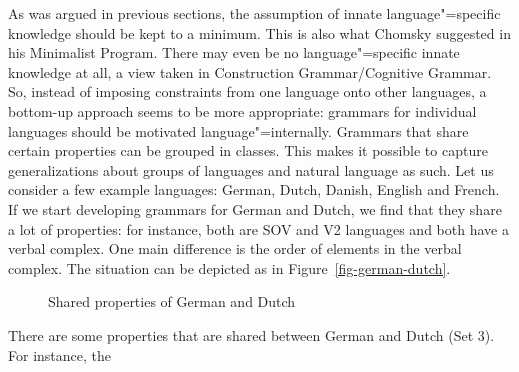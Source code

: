 As was argued in previous sections, the assumption of innate language"=specific knowledge should be
kept to a minimum. This is also what Chomsky suggested in his Minimalist Program. There may even be no language"=specific innate knowledge at all, a view taken in Construction
Grammar/Cognitive Grammar. So, instead of imposing constraints from one language onto other languages, a bottom-up approach seems
to be more appropriate: grammars for individual languages should be motivated language"=internally. Grammars that share certain properties can be grouped in classes. This makes it possible
to capture generalizations about groups of languages and natural language as such. Let us consider a
few example languages: German, Dutch, Danish, English and French. If we start developing grammars for German and
Dutch, we find that they share a lot of properties: for instance, both are SOV and V2 languages and both have a
verbal complex. One main difference is the order of elements in the verbal complex. The situation
can be depicted as in Figure~\vref{fig-german-dutch}.
\begin{figure}
\centering
{}
\caption{\label{fig-german-dutch}Shared properties of German and Dutch}
\end{figure}%
There are some properties that are shared between German and Dutch (Set 3). For instance, the
